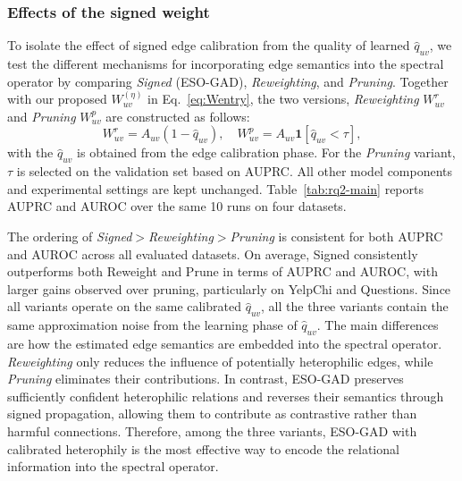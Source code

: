 \subsubsection{Effects of the signed weight}\label{sec:rq2}
To isolate the effect of signed edge calibration from the quality of learned $\hat{q}_{uv}$, we test the different mechanisms for incorporating edge semantics into the spectral operator by comparing \textit{Signed} (ESO-GAD), \textit{Reweighting}, and \textit{Pruning}. 
Together with our proposed $W_{uv}^{(\eta)}$ in Eq.~\eqref{eq:Wentry}, the two versions, \textit{Reweighting} $W_{uv}^{r}$ and \textit{Pruning} $W_{uv}^{p}$ are constructed as follows:
\begin{equation}
W^{r}_{uv} = A_{uv}(1 - \hat{q}_{uv}), \quad
W^{p}_{uv} = A_{uv}\mathbf{1}[\hat{q}_{uv} < \tau],
\end{equation}
with the $\hat{q}_{uv}$ is obtained from the edge calibration phase.
For the \textit{Pruning} variant, $\tau$ is selected on the validation set based on AUPRC.
All other model components and experimental settings are kept unchanged.
Table~\ref{tab:rq2-main} reports AUPRC and AUROC over the same 10 runs on four datasets.

The ordering of \textit{Signed}$>$\textit{Reweighting}$>$\textit{Pruning} is consistent for both AUPRC and AUROC across all evaluated datasets.
On average, Signed consistently outperforms both Reweight and Prune in terms of AUPRC and AUROC, with larger gains observed over pruning, particularly on YelpChi and Questions.
Since all variants operate on the same calibrated $\hat{q}_{uv}$,
all the three variants contain the same approximation noise from the learning phase of $\hat{q}_{uv}$.
The main differences are how the estimated edge semantics are embedded into the spectral operator.
\textit{Reweighting} only reduces the influence of potentially heterophilic edges, while \textit{Pruning} eliminates their contributions.
In contrast, ESO-GAD preserves sufficiently confident heterophilic relations and reverses their semantics through signed propagation, allowing them to contribute as contrastive rather than harmful connections.
Therefore, among the three variants, ESO-GAD with calibrated heterophily is the most effective way to encode the relational information into the spectral operator. %



